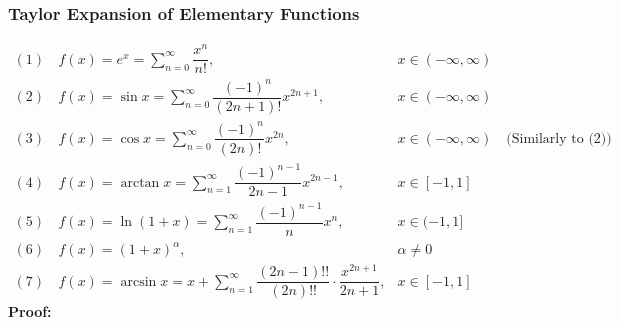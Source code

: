 \documentclass{article}
\newcommand{\infsum}{\sum\limits_{n=1}^\infty}
\newcommand{\0}{{\bf{0}}}
\begin{document}
\subsubsection{Taylor Expansion of Elementary Functions}
$$\begin{matrix}
    (1)\,&f(x)=e^x=\sum\limits_{n=0}^\infty\dfrac{x^n}{n!},&x\in(-\infty,\infty)\\[8pt]
    (2)\,&f(x)=\sin x=\sum\limits_{n=0}^\infty\dfrac{(-1)^n}{(2n+1)!}x^{2n+1},&x\in(-\infty,\infty)\\[8pt]
    (3)\,&f(x)=\cos x=\sum\limits_{n=0}^\infty\dfrac{(-1)^n}{(2n)!}x^{2n},&x\in(-\infty,\infty)\quad\mbox{(Similarly to (2))}\\[8pt]
    (4)\,&f(x)=\arctan x=\infsum\dfrac{(-1)^{n-1}}{2n-1}x^{2n-1},&x\in[-1,1]\\[8pt]
    (5)\,&f(x)=\ln(1+x)=\infsum\dfrac{(-1)^{n-1}}{n}x^n,&x\in(-1,1]\\[14pt]
    (6)\,&f(x)=(1+x)^\alpha,&\alpha\neq0\\[8pt]
    (7)\,&f(x)=\arcsin x=x+\infsum\dfrac{(2n-1)!!}{(2n)!!}\cdot\dfrac{x^{2n+1}}{2n+1},&x\in[-1,1]
\end{matrix}$$
\textbf{Proof:}
\end{document}
